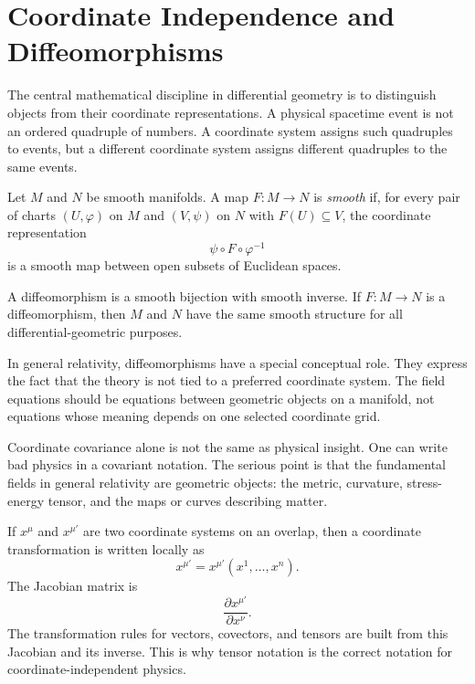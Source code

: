 \clearpage

\section{Coordinate Independence and Diffeomorphisms}

The central mathematical discipline in differential geometry is to distinguish
objects from their coordinate representations. A physical spacetime event is not
an ordered quadruple of numbers. A coordinate system assigns such quadruples to
events, but a different coordinate system assigns different quadruples to the
same events.

\begin{definitionbox}
Let \(M\) and \(N\) be smooth manifolds. A map \(F:M\to N\) is \emph{smooth} if,
for every pair of charts \((U,\varphi)\) on \(M\) and \((V,\psi)\) on \(N\) with
\(F(U)\subseteq V\), the coordinate representation
\[
\psi\circ F\circ \varphi^{-1}
\]
is a smooth map between open subsets of Euclidean spaces.
\end{definitionbox}

A diffeomorphism is a smooth bijection with smooth inverse. If
\(F:M\to N\) is a diffeomorphism, then \(M\) and \(N\) have the same smooth
structure for all differential-geometric purposes.

In general relativity, diffeomorphisms have a special conceptual role. They
express the fact that the theory is not tied to a preferred coordinate system.
The field equations should be equations between geometric objects on a manifold,
not equations whose meaning depends on one selected coordinate grid.

\begin{remarkbox}
Coordinate covariance alone is not the same as physical insight. One can write
bad physics in a covariant notation. The serious point is that the fundamental
fields in general relativity are geometric objects: the metric, curvature,
stress-energy tensor, and the maps or curves describing matter.
\end{remarkbox}

If \(x^\mu\) and \(x^{\mu'}\) are two coordinate systems on an overlap, then a
coordinate transformation is written locally as
\[
x^{\mu'}=x^{\mu'}(x^1,\ldots,x^n).
\]
The Jacobian matrix is
\[
\frac{\partial x^{\mu'}}{\partial x^\nu}.
\]
The transformation rules for vectors, covectors, and tensors are built from this
Jacobian and its inverse. This is why tensor notation is the correct notation
for coordinate-independent physics.


